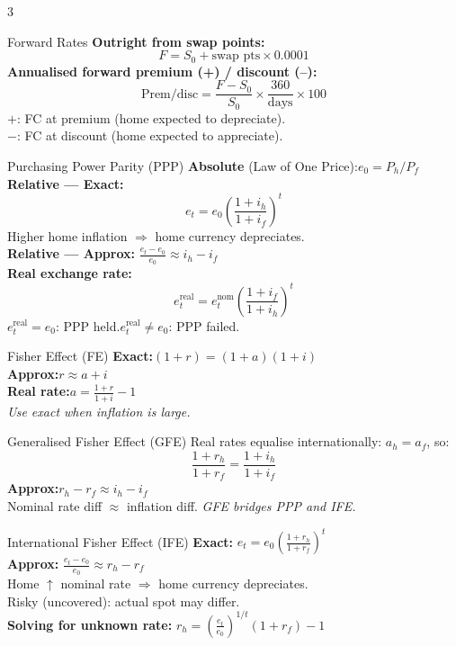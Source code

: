 \documentclass[7.5pt,a4paper]{article}
\newcommand{\dsp}{\displaystyle}
\newcommand{\rh}{r_{\!h}}
\newcommand{\rf}{r_{\!f}}
\newcommand{\ih}{i_h}
\newcommand{\iif}{i_f}          %
\newcommand{\kw}[1]{\textbf{#1}}
\newcommand{\ex}[1]{\textit{\fontsize{5.8}{7}\selectfont #1}}
\begin{document}
\begin{multicols}{3}
\begin{fsect}{Forward Rates}
\kw{Outright from swap points:}
\[
  F = S_0 + \text{swap pts}\times 0.0001
\]
\kw{Annualised forward premium (+) / discount (--):}
\[
  \text{Prem/disc} = \frac{F-S_0}{S_0}\times\frac{360}{\mathrm{days}}\times 100
\]
$+$: FC at premium (home expected to depreciate).\\
$-$: FC at discount (home expected to appreciate).
\end{fsect}

\columnbreak

\begin{fsect}{Purchasing Power Parity (PPP)}
\kw{Absolute} (Law of One Price):\quad $e_0=P_h/P_f$\\[3pt]
\kw{Relative --- Exact:}
\[
  e_t = e_0\!\left(\frac{1+\ih}{1+\iif}\right)^{\!t}
\]
Higher home inflation $\Rightarrow$ home currency depreciates.\\[2pt]
\kw{Relative --- Approx:}\quad
$\dsp\frac{e_t-e_0}{e_0}\approx \ih - \iif$\\[3pt]
\kw{Real exchange rate:}
\[
  e_t^{\text{real}} = e_t^{\text{nom}}\!\left(\frac{1+\iif}{1+\ih}\right)^{\!t}
\]
$e_t^{\text{real}}=e_0$: PPP held.\quad $e_t^{\text{real}}\neq e_0$: PPP failed.
\end{fsect}

\begin{fsect}{Fisher Effect (FE)}
\kw{Exact:}\quad $(1+r)=(1+a)(1+i)$\\[1pt]
\kw{Approx:}\quad $r\approx a+i$\\[1pt]
\kw{Real rate:}\quad $\dsp a=\frac{1+r}{1+i}-1$\\[1pt]
\ex{Use exact when inflation is large.}
\end{fsect}

\begin{fsect}{Generalised Fisher Effect (GFE)}
Real rates equalise internationally: $a_h=a_f$, so:
\[
  \frac{1+\rh}{1+\rf}=\frac{1+\ih}{1+\iif}
\]
\kw{Approx:}\quad $\rh-\rf\approx\ih-\iif$\\
Nominal rate diff $\approx$ inflation diff.
\ex{GFE bridges PPP and IFE.}
\end{fsect}

\begin{fsect}{International Fisher Effect (IFE)}
\kw{Exact:}\quad
$\dsp e_t = e_0\!\left(\frac{1+\rh}{1+\rf}\right)^{\!t}$\\[3pt]
\kw{Approx:}\quad
$\dsp\frac{e_t-e_0}{e_0}\approx \rh-\rf$\\[2pt]
Home $\uparrow$ nominal rate $\Rightarrow$ home currency depreciates.\\
Risky (uncovered): actual spot may differ.\\[1pt]
\kw{Solving for unknown rate:}
$\dsp\rh =\left(\frac{e_t}{e_0}\right)^{\!1/t}(1+\rf)-1$
\end{fsect}


\end{multicols}
\end{document}
